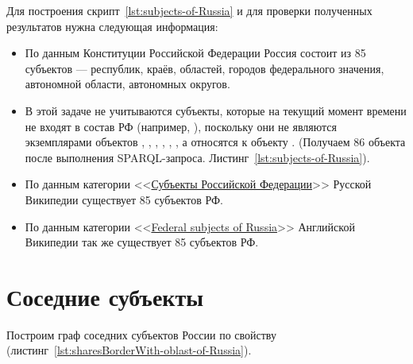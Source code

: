 Для построения скрипт~\protect\ref{lst:subjects-of-Russia} и для проверки полученных результатов нужна следующая информация:
\begin{itemize}
  \item По данным Конституции Российской Федерации Россия состоит из 85 субъектов — республик, краёв, областей, городов федерального значения, автономной области, автономных округов.
  \item В этой задаче не учитываются субъекты, которые на текущий момент времени не входят в состав РФ (например, ), поскольку они не являются экземплярами объектов , , , , , , а относятся к объекту . (Получаем 86 объекта после выполнения SPARQL-запроса. Листинг~\protect\ref{lst:subjects-of-Russia}). 
  \item По данным категории <<\href{https://ru.wikipedia.org/wiki/Субъекты_Российской_Федерации}{Субъекты Российской Федерации}>> Русской Википедии существует 85 субъектов РФ.
  \item По данным категории <<\href{https://ru.wikipedia.org/wiki/en:Federal_subjects_of_Russia}{Federal subjects of Russia}>> Английской Википедии так же существует 85 субъектов РФ.
\end{itemize}


\section{Соседние субъекты}

Построим граф соседних субъектов России по свойству  (листинг~\protect\ref{lst:sharesBorderWith-oblast-of-Russia}).

